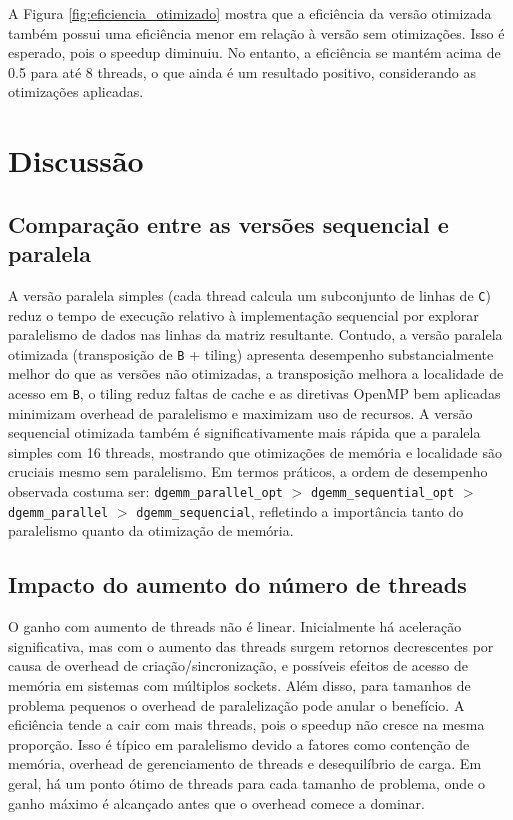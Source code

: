 \documentclass[12pt, a4paper]{article}
\begin{document}
	A Figura \ref{fig:eficiencia_otimizado} mostra que a eficiência da versão otimizada também possui uma eficiência menor em relação à versão sem otimizações. Isso é esperado, pois o speedup diminuiu. No entanto, a eficiência se mantém acima de 0.5 para até 8 threads, o que ainda é um resultado positivo, considerando as otimizações aplicadas.

	\newpage
	\section{Discussão}

	\subsection{Comparação entre as versões sequencial e paralela}
	
	A versão paralela simples (cada thread calcula um subconjunto de linhas de \texttt{C}) reduz o tempo de execução relativo à implementação sequencial por explorar paralelismo de dados nas linhas da matriz resultante. Contudo, a versão paralela otimizada (transposição de \texttt{B} + tiling) apresenta desempenho substancialmente melhor do que as versões não otimizadas, a transposição melhora a localidade de acesso em \texttt{B}, o tiling reduz faltas de cache e as diretivas OpenMP bem aplicadas minimizam overhead de paralelismo e maximizam uso de recursos. A versão sequencial otimizada também é significativamente mais rápida que a paralela simples com 16 threads, mostrando que otimizações de memória e localidade são cruciais mesmo sem paralelismo. Em termos práticos, a ordem de desempenho observada costuma ser: \texttt{dgemm\_parallel\_opt} $>$ \texttt{dgemm\_sequential\_opt} $>$ \texttt{dgemm\_parallel} $>$ \texttt{dgemm\_sequencial}, refletindo a importância tanto do paralelismo quanto da otimização de memória.

	\subsection{Impacto do aumento do número de threads}

	O ganho com aumento de threads não é linear. Inicialmente há aceleração significativa, mas com o aumento das threads surgem retornos decrescentes por causa de overhead de criação/sincronização, e possíveis efeitos de acesso de memória em sistemas com múltiplos sockets. Além disso, para tamanhos de problema pequenos o overhead de paralelização pode anular o benefício. A eficiência tende a cair com mais threads, pois o speedup não cresce na mesma proporção. Isso é típico em paralelismo devido a fatores como contenção de memória, overhead de gerenciamento de threads e desequilíbrio de carga. Em geral, há um ponto ótimo de threads para cada tamanho de problema, onde o ganho máximo é alcançado antes que o overhead comece a dominar.
\end{document}
